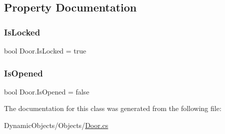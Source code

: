 \subsection{Property Documentation}
\mbox{\label{class_door_a1c9886fb6a29176e7b1921912bedc528}} 
\subsubsection{\texorpdfstring{Is\+Locked}{IsLocked}}
{\footnotesize\ttfamily bool Door.\+Is\+Locked = true\hspace{0.3cm}{\ttfamily [get]}}

\mbox{\label{class_door_ad1cf34da4066c4081f0aa46007d649b9}} 
\subsubsection{\texorpdfstring{Is\+Opened}{IsOpened}}
{\footnotesize\ttfamily bool Door.\+Is\+Opened = false\hspace{0.3cm}{\ttfamily [get]}}



The documentation for this class was generated from the following file\+:\begin{DoxyCompactItemize}
\item 
Dynamic\+Objects/\+Objects/\mbox{\hyperlink{_door_8cs}{Door.\+cs}}\end{DoxyCompactItemize}

